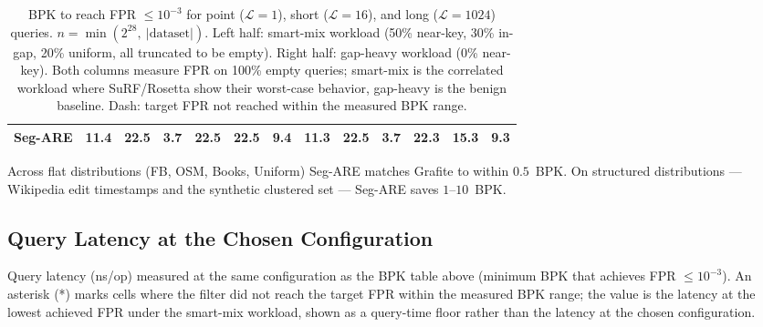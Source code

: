 \begin{table}[H]
\begin{tabular}{@{}lrrrrrr|rrrrrr@{}}
        Seg-ARE & 11.4          & \textbf{22.5}    & \textbf{3.7}     & \textbf{22.5}    & \textbf{22.5}    & \textbf{9.4}     & \textbf{11.3} & 22.5             & \textbf{3.7}     & 22.3             & \textbf{15.3} & \textbf{9.3} \\
        \bottomrule
    \end{tabular}
    \caption{BPK to reach FPR $\leq 10^{-3}$ for point ($\mathcal{L}=1$),
        short ($\mathcal{L}=16$), and long ($\mathcal{L}=1024$) queries.
        $n = \min(2^{28},\ |\text{dataset}|)$.
        Left half: smart-mix workload (50\% near-key, 30\% in-gap,
        20\% uniform, all truncated to be empty). Right half:
        gap-heavy workload (0\% near-key). Both columns measure
        FPR on 100\% empty queries; smart-mix is the correlated
        workload where SuRF/Rosetta show their worst-case
        behavior, gap-heavy is the benign baseline.
        Dash: target FPR not reached within the measured BPK range.}
    \label{tab:bpk}
\end{table}

Across flat distributions (FB, OSM, Books, Uniform) Seg-ARE matches Grafite to within $0.5$~BPK.
On structured distributions --- Wikipedia edit timestamps and the synthetic clustered set --- Seg-ARE saves $1$--$10$~BPK.


\subsection{Query Latency at the Chosen Configuration}
\label{subsec:eval-latency}

Query latency (ns/op) measured at the same configuration as the BPK table above
(minimum BPK that achieves FPR $\leq 10^{-3}$).
An asterisk (*) marks cells where the filter did not reach the target FPR
within the measured BPK range; the value is the latency at the lowest achieved FPR under the smart-mix workload,
shown as a query-time floor rather than the latency at the chosen configuration.

